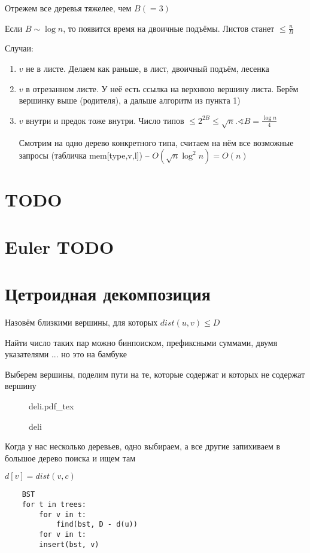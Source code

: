 \documentclass{book}
\theoremstyle{definition}
\newcommand{\incfig}[1]{%
    \def\svgwidth{\columnwidth}
    {#1.pdf_tex}
}
\begin{document}
Отрежем все деревья тяжелее, чем $B (=3)$

Если  $B \sim \log n$, то появится время на двоичные подъёмы. Листов станет $\leqslant \frac{n}{B}$
 
Случаи:
\begin{enumerate}
    \item $v$ не в листе. Делаем как раньше, в лист, двоичный подъём, лесенка
    \item  $v$ в отрезанном листе. У неё есть ссылка на верхнюю вершину листа. Берём вершинку выше (родителя), а дальше алгоритм из пункта 1)
    \item  $v$ внутри и предок тоже внутри. Число типов $\leqslant 2^{2B}\leqslant \sqrt{n} . \sphericalangle B = \frac{\log n}{4}$ 

        Смотрим на одно дерево конкретного типа, считаем на нём все возможные запросы (табличка mem[type,v,l]) -- $O(\sqrt{n}\log ^2n) = O(n) $
\end{enumerate}

\section{TODO}
\section{Euler TODO}
\section{Цетроидная декомпозиция}

Назовём близкими вершины, для которых $dist(u,v)\leqslant D$

Найти число таких пар можно бинпоиском, префиксными суммами, двумя указателями ... но это на бамбуке

Выберем вершины, поделим пути на те, которые содержат и которых не содержат вершину

\begin{figure}[!ht]
    \centering
    \incfig{deli}
    \caption{deli}
    \label{fig:deli}
\end{figure}

Когда у нас несколько деревьев, одно выбираем, а все другие запихиваем в большое дерево поиска и ищем там

$d[v] = dist(v, c)$

\begin{lstlisting}
    BST
    for t in trees:
        for v in t:
            find(bst, D - d(u))
        for v in t:
        insert(bst, v)
\end{lstlisting}
\end{document}
